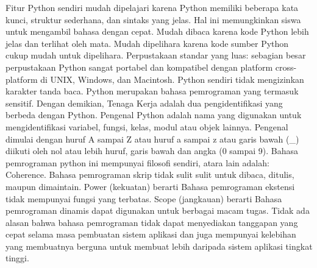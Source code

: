 Fitur Python sendiri mudah dipelajari karena Python memiliki beberapa kata kunci, struktur sederhana, dan sintaks yang jelas. Hal ini memungkinkan siswa untuk mengambil bahasa dengan cepat. Mudah dibaca karena kode Python lebih jelas dan terlihat oleh mata. Mudah dipelihara karena kode sumber Python cukup mudah untuk dipelihara.
Perpustakaan standar yang luas: sebagian besar perpustakaan Python sangat portabel dan kompatibel dengan platform cross-platform di UNIX, Windows, dan Macintosh. 
Python sendiri tidak mengizinkan karakter tanda baca. Python merupakan  bahasa pemrograman yang termasuk sensitif. Dengan demikian, Tenaga Kerja adalah dua pengidentifikasi yang berbeda dengan Python. Pengenal Python adalah nama yang digunakan untuk mengidentifikasi variabel, fungsi, kelas, modul atau objek lainnya. Pengenal dimulai dengan huruf A sampai Z atau huruf a sampai z atau garis bawah (_) diikuti oleh nol atau lebih huruf, garis bawah dan angka (0 sampai 9). Bahasa pemrograman python ini mempunyai filosofi sendiri, atara lain adalah:
Coherence. Bahasa pemrograman skrip tidak sulit sulit untuk dibaca, ditulis, maupun dimaintain. Power (kekuatan) berarti Bahasa pemrograman ekstensi tidak mempunyai fungsi yang terbatas. Scope (jangkauan) berarti Bahasa pemrograman dinamis dapat digunakan untuk berbagai macam tugas. Tidak ada alasan bahwa bahasa pemrograman tidak dapat menyediakan tanggapan yang cepat selama masa pembuatan sistem aplikasi dan juga mempunyai kelebihan yang membuatnya berguna untuk membuat lebih daripada sistem aplikasi tingkat tinggi.


